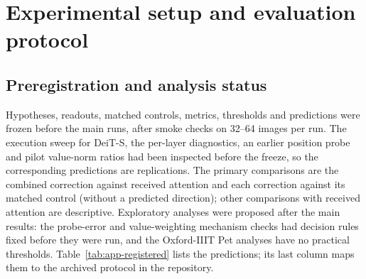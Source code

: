 
\captionsetup{skip=5pt}
\raggedbottom
\renewcommand{\topfraction}{0.9}\renewcommand{\bottomfraction}{0.6}\renewcommand{\textfraction}{0.1}\renewcommand{\floatpagefraction}{0.85}\setcounter{totalnumber}{5}\setcounter{bottomnumber}{3}

\section{Experimental setup and evaluation protocol}
\label{app:setup}

\subsection{Preregistration and analysis status}
Hypotheses, readouts, matched controls, metrics, thresholds and predictions were frozen before the main runs, after smoke checks on 32--64 images per run. The execution sweep for DeiT-S, the per-layer diagnostics, an earlier position probe and pilot value-norm ratios had been inspected before the freeze, so the corresponding predictions are replications. The primary comparisons are the combined correction against received attention and each correction against its matched control (without a predicted direction); other comparisons with received attention are descriptive. Exploratory analyses were proposed after the main results: the probe-error and value-weighting mechanism checks had decision rules fixed before they were run, and the Oxford-IIIT Pet analyses have no practical thresholds. Table~\ref{tab:app-registered} lists the predictions; its last column maps them to the archived protocol in the repository.

